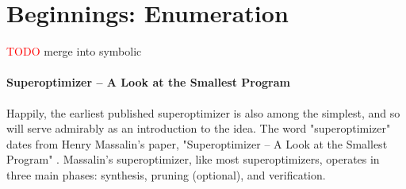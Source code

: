 \documentclass[12pt,twoside]{reedthesis}
\newcommand{\red}[1]{\textcolor{red}{#1}}
\newcommand{\addressed}[2]{{#1}}
\begin{document}

\chapter{Beginnings: Enumeration}
\red{TODO} merge into symbolic

\subsubsection{Superoptimizer -- A Look at the Smallest Program}
Happily, the earliest published superoptimizer is also among the simplest, and so will serve admirably as an
    \addressed{introduction to the idea}{at some point you should lay out a more complete/formal problem statement. You can use this first paper to do this but then I would talk about it earlier, in the introduction}. 
The word "superoptimizer" dates from Henry Massalin's paper, "Superoptimizer -- A Look at the Smallest Program" \cite{massalin1987superoptimizer}.
Massalin's superoptimizer, like most superoptimizers, operates in three main phases: synthesis, pruning (optional), and verification.
    
\end{document}

